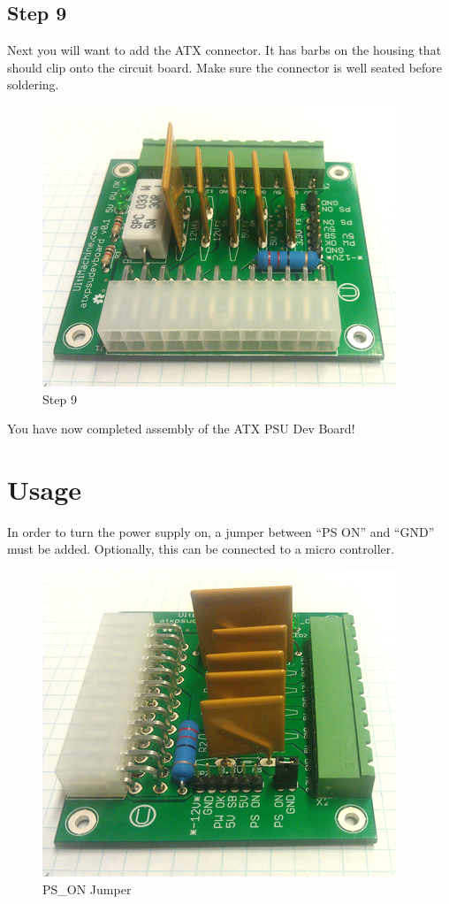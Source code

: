 \subsection{Step 9}

Next you will want to add the ATX connector. It has barbs on the housing
that should clip onto the circuit board. Make sure the connector is well
seated before soldering.

\begin{figure}[H]
\centering
\includegraphics{./png/step-09.png}
\caption{Step 9}
\end{figure}

You have now completed assembly of the ATX PSU Dev Board!

\section{Usage}

In order to turn the power supply on, a jumper between ``PS ON'' and
``GND'' must be added. Optionally, this can be connected to a micro
controller.

\begin{figure}[H]
\centering
\includegraphics{./png/step-10.png}
\caption{PS\_ON Jumper}
\end{figure}

